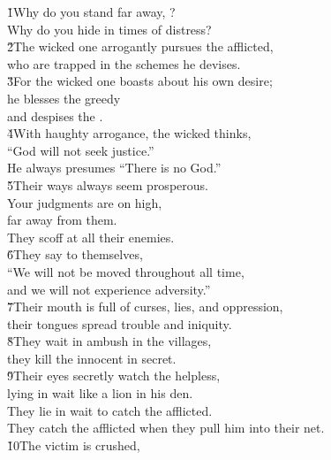 \begin{poetry}
\poeml \v{1}Why do you stand far away, ? \\
\poemll    Why do you hide in times of distress? \\
\poeml \v{2}The wicked one arrogantly pursues the afflicted, \\
\poemll    who are trapped in the schemes he devises. \\
\poeml \v{3}For the wicked one boasts about his own desire; \\
\poemll    he blesses the greedy \\
\poemlll       and despises the . \\
\poeml \v{4}With haughty arrogance, the wicked thinks, \\
\poemll    ``God will not seek justice.'' \\
\poemlll       He always presumes ``There is no God.'' \\
\poeml \v{5}Their ways always seem prosperous. \\
\poeml Your judgments are on high, \\
\poemlll       far away from them. \\
\poeml They scoff at all their enemies. \\
\poeml \v{6}They say to themselves, \\
\poemll    ``We will not be moved throughout all time, \\
\poemlll       and we will not experience adversity.'' \\
\poeml \v{7}Their mouth is full of curses, lies, and oppression, \\
\poemll    their tongues spread trouble and iniquity. \\
\poeml \v{8}They wait in ambush in the villages, \\
\poemll    they kill the innocent in secret. \\
\poeml \v{9}Their eyes secretly watch the helpless, \\
\poemll    lying in wait like a lion in his den. \\
\poeml They lie in wait to catch the afflicted. \\
\poemll    They catch the afflicted when they pull him into their net. \\
\poeml \v{10}The victim is crushed, \\

\end{poetry}
